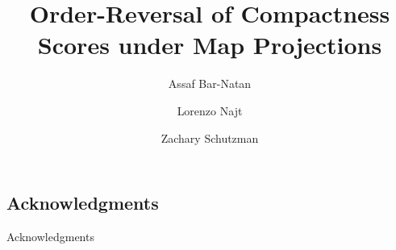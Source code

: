 \documentclass{article}
\title{Order-Reversal of Compactness Scores under Map Projections}
\author{Assaf Bar-Natan \and Lorenzo Najt \and Zachary Schutzman }
\theoremstyle{definition}
\theoremstyle{remark}
\begin{document}
\maketitle
	
\begin{abstract}

\end{abstract}




















\ifarxiv
\subsection*{Acknowledgments}


\else

\begin{acknowledgment}{Acknowledgments}

\end{acknowledgment}
\fi




\pagebreak
\appendix


\end{document}
